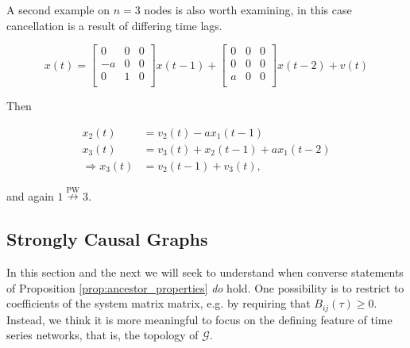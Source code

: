 \documentclass[12pt]{article}
\def\pwgc{\overset{\text{PW}}{\rightarrow}}  %
\def\npwgc{\overset{\text{PW}}{\nrightarrow}}  %
\def\gcg{\mathcal{G}}  %
\begin{document}
\begin{example}
  \label{ex:lag_cancellation}
  A second example on $n = 3$ nodes is also worth examining, in this case
  cancellation is a result of differing time lags.

\begin{equation*}
  x(t) =
  \left[
    \begin{array}{ccc}
      0 & 0 & 0\\
      -a & 0 & 0\\
      0 & 1 & 0\\
    \end{array}
  \right] x(t - 1) +
  \left[
    \begin{array}{ccc}
      0 & 0 & 0\\
      0 & 0 & 0\\
      a & 0 & 0\\
    \end{array}
  \right] x(t - 2) + v(t)
\end{equation*}

Then

\begin{align*}
  x_2(t) &= v_2(t) - ax_1(t - 1)\\
  x_3(t) &= v_3(t) + x_2(t - 1) + ax_1(t - 2)\\
  \Rightarrow x_3(t) &= v_2(t - 1) + v_3(t),
\end{align*}

and again $1 \npwgc 3$.
\end{example}

\subsection{Strongly Causal Graphs}
\label{sec:strongly_causal_graphs}

In this section and the next we will seek to understand when converse
statements of Proposition \ref{prop:ancestor_properties} \textit{do}
hold.  One possibility is to restrict to coefficients of the system
matrix matrix, e.g. by requiring that $B_{ij}(\tau) \ge 0$.  Instead,
we think it is more meaningful to focus on the defining feature of
time series networks, that is, the topology of $\gcg$.
\end{document}
